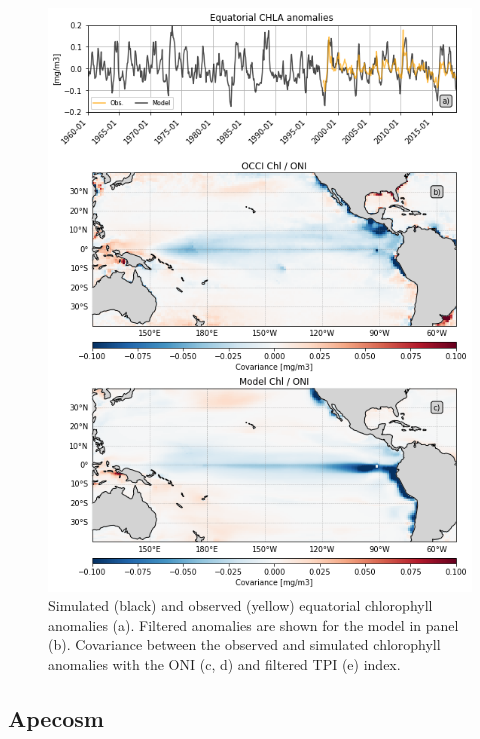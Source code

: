 \begin{figure}
	\centering
	\includegraphics[scale=0.4]{figs/fig2.png}
	\caption{Simulated (black) and observed (yellow) equatorial chlorophyll anomalies (a). Filtered anomalies are shown for the model in panel (b). Covariance between the observed and simulated chlorophyll anomalies with the ONI (c, d) and filtered TPI (e) index.}
	\label{fig:nemo-sat-chl}
\end{figure}

\subsection{Apecosm}

